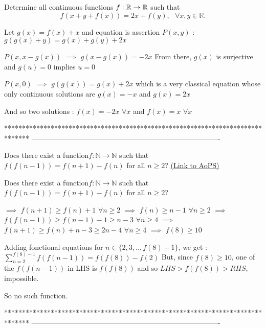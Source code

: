\begin{solution}
	\begin{tcolorbox}Determine all continuous  functions $f: \Bbb{R} \to \Bbb{R}$ such that \[\displaystyle{\displaystyle{  f(x+y+f(x))=2x+f(y)  , \ \ \ \forall x,y \in  \mathbb{R}. }}\]\end{tcolorbox}
Let $g(x)=f(x)+x$ and equation is assertion $P(x,y)$ : $g(g(x)+y)=g(x)+g(y)+2x$

$P(x,x-g(x))$ $\implies$ $g(x-g(x))=-2x$
From there, $g(x)$ is surjective  and $g(u)=0$ implies $u=0$

$P(x,0)$ $\implies$ $g(g(x))=g(x)+2x$ which is a very classical equation whose only continuous solutions are $g(x)=-x$ and $g(x)=2x$ 

And so two solutions : $\boxed{f(x)=-2x}$ $\forall x$ and $\boxed{f(x)=x}$ $\forall x$
\end{solution}
*******************************************************************************
-------------------------------------------------------------------------------

\begin{problem}
	Does there exist a function$ f:\mathbb N\to\mathbb N$ such that $f(f(n-1)) = f(n+1) -f(n)$ for all $n \geq 2$?
	\flushright \href{https://artofproblemsolving.com/community/c6h610236}{(Link to AoPS)}
\end{problem}



\begin{solution}
	\begin{tcolorbox}Does there exist a function$ f:\mathbb N\to\mathbb N$ such that $f(f(n-1)) = f(n+1) -f(n)$ for all $n \geq 2$?\end{tcolorbox}
$\implies$ $f(n+1)\ge f(n)+1$ $\forall n\ge 2$ $\implies$ $f(n)\ge n-1$ $\forall n\ge 2$
$\implies$ $f(f(n-1))\ge f(n-1)-1\ge n-3$ $\forall n\ge 4$
$\implies$ $f(n+1)\ge f(n)+n-3\ge 2n-4$ $\forall n\ge 4$
$\implies$ $f(8)\ge 10$

Adding fonctional equations for $n\in\{2,3,..,f(8)-1\}$, we get : $\sum_{n=2}^{f(8)-1}f(f(n-1))=f(f(8))-f(2)$
But, since $f(8)\ge 10$, one of the $f(f(n-1))$ in LHS is $f(f(8))$ and so $LHS>f(f(8))>RHS$, impossible.

So no such function.
\end{solution}
*******************************************************************************
-------------------------------------------------------------------------------

